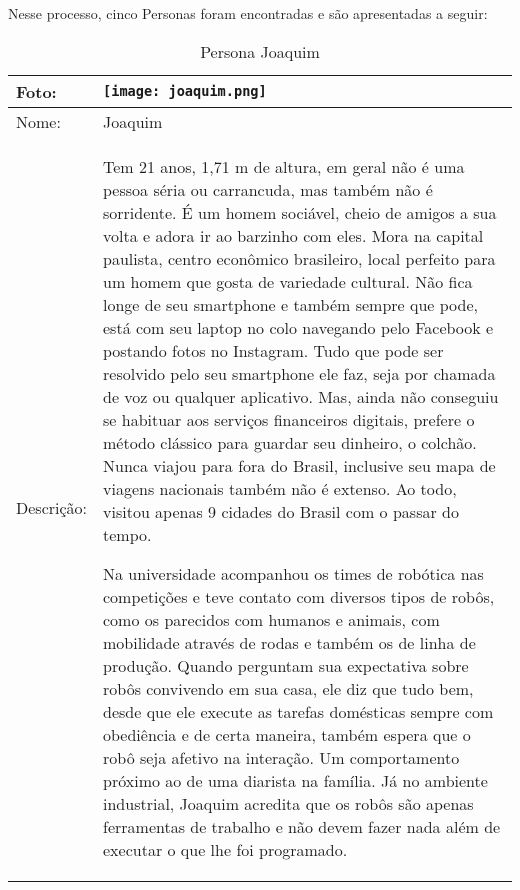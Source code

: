 Nesse processo, cinco Personas foram encontradas e são apresentadas a seguir:
\begin{table}[!ht]
	\caption{Persona Joaquim}
	\label{tab:joaquim}
	\centering
	\begin{tabular}{ m{2 cm} | m{13cm} }
		\hline
		Foto: & \rule{0cm}{2.7cm} \texttt{[image: joaquim.png]} \\
		\hline
		Nome: & Joaquim \\
		\hline
		Descrição: & Tem 21 anos, 1,71 m de altura, em geral não é uma pessoa séria ou carrancuda, mas também não é sorridente. É um homem sociável, cheio de amigos a sua volta e adora ir ao barzinho com eles. Mora na capital paulista, centro econômico brasileiro, local perfeito para um homem que gosta de variedade cultural. Não fica longe de seu smartphone e também sempre que pode, está com seu laptop no colo navegando pelo Facebook e postando fotos no Instagram. Tudo que pode ser resolvido pelo seu smartphone ele faz, seja por chamada de voz ou qualquer aplicativo. Mas, ainda não conseguiu se habituar aos serviços financeiros digitais, prefere o método clássico para guardar seu dinheiro, o colchão. Nunca viajou para fora do Brasil, inclusive seu mapa de viagens nacionais também não é extenso. Ao todo, visitou apenas 9 cidades do Brasil com o passar do tempo.

		Na universidade acompanhou os times de robótica nas competições e teve contato com diversos tipos de robôs, como os parecidos com humanos e animais, com mobilidade através de rodas e também os de linha de produção. Quando perguntam sua expectativa sobre robôs convivendo em sua casa, ele diz que tudo bem, desde que ele execute as tarefas domésticas sempre com obediência e de certa maneira, também espera que o robô seja afetivo na interação. Um comportamento próximo ao de uma diarista na família. Já no ambiente industrial, Joaquim acredita que os robôs são apenas ferramentas de trabalho e não devem fazer nada além de executar o que lhe foi programado. \\
		\hline
	\end{tabular}
\end{table}

